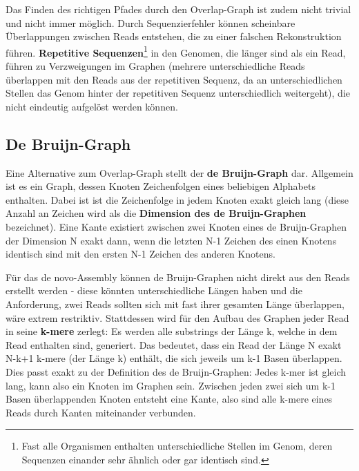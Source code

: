 Das Finden des richtigen Pfades durch den Overlap-Graph ist zudem nicht trivial und nicht immer möglich. Durch Sequenzierfehler können scheinbare Überlappungen zwischen Reads entstehen, die zu einer falschen Rekonstruktion führen. \textbf{Repetitive Sequenzen}\footnote{Fast alle Organismen enthalten unterschiedliche Stellen im Genom, deren Sequenzen einander sehr ähnlich oder gar identisch sind.} in den Genomen, die länger sind als ein Read, führen zu Verzweigungen im Graphen (mehrere unterschiedliche Reads überlappen mit den Reads aus der repetitiven Sequenz, da an unterschiedlichen Stellen das Genom hinter der repetitiven Sequenz unterschiedlich weitergeht), die nicht eindeutig aufgelöst werden können. 

\subsection{De Bruijn-Graph}

Eine Alternative zum Overlap-Graph stellt der \textbf{de Bruijn-Graph} dar. Allgemein ist es ein Graph, dessen Knoten Zeichenfolgen eines beliebigen Alphabets enthalten. Dabei ist ist die Zeichenfolge in jedem Knoten exakt gleich lang (diese Anzahl an Zeichen wird als die \textbf{Dimension des de Bruijn-Graphen} bezeichnet). Eine Kante existiert zwischen zwei Knoten eines de Bruijn-Graphen der Dimension N exakt dann, wenn die letzten N-1 Zeichen des einen Knotens identisch sind mit den ersten N-1 Zeichen des anderen Knotens. 

Für das de novo-Assembly können de Bruijn-Graphen nicht direkt aus den Reads erstellt werden - diese könnten unterschiedliche Längen haben und die Anforderung, zwei Reads sollten sich mit fast ihrer gesamten Länge überlappen, wäre extrem restriktiv. Stattdessen wird für den Aufbau des Graphen jeder Read in seine \textbf{k-mere} zerlegt: Es werden alle substrings der Länge k, welche in dem Read enthalten sind, generiert. Das bedeutet, dass ein Read der Länge N exakt N-k+1 k-mere (der Länge k) enthält, die sich jeweils um k-1 Basen überlappen. Dies passt exakt zu der Definition des de Bruijn-Graphen: Jedes k-mer ist gleich lang, kann also ein Knoten im Graphen sein. Zwischen jeden zwei sich um k-1 Basen überlappenden Knoten entsteht eine Kante, also sind alle k-mere eines Reads durch Kanten miteinander verbunden. 

